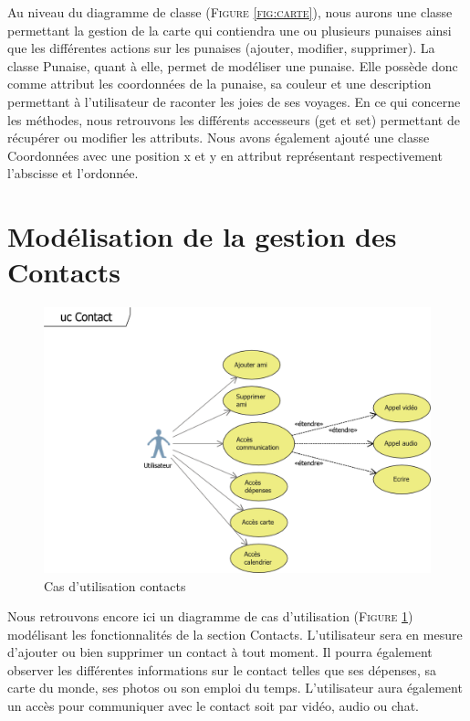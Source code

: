 \documentclass[11pt]{article}
\begin{document}
Au niveau du diagramme de classe  (\textsc{Figure \ref{fig:carte}}), nous aurons une classe permettant la gestion de la carte qui contiendra une ou plusieurs punaises ainsi que les différentes actions sur les punaises (ajouter, modifier, supprimer). La classe Punaise, quant à elle, permet de modéliser une punaise. Elle possède donc comme attribut les coordonnées de la punaise, sa couleur et une description permettant à l'utilisateur de raconter les joies de ses voyages. En ce qui concerne les méthodes, nous retrouvons les différents accesseurs (get et set) permettant de récupérer ou modifier les attributs. Nous avons également ajouté une classe Coordonnées avec une position x et y en attribut représentant respectivement l’abscisse et l’ordonnée.
\newpage
\section{Modélisation de la gestion des Contacts}
\begin{figure}[!h]
        \centering \includegraphics[scale=1]{ucContact.png}
        \caption{Cas d'utilisation contacts}
         \label{fig:ucContact}
\end{figure}
Nous retrouvons encore ici un diagramme de cas d’utilisation (\textsc{Figure \ref{fig:ucContact}}) modélisant les fonctionnalités de la section Contacts. L’utilisateur sera en mesure d’ajouter ou bien supprimer un contact à tout moment. Il pourra également observer les différentes informations sur le contact telles que ses dépenses, sa carte du monde, ses photos ou son emploi du temps. L’utilisateur aura également un accès pour communiquer avec le contact soit par vidéo, audio ou chat.
\end{document}
